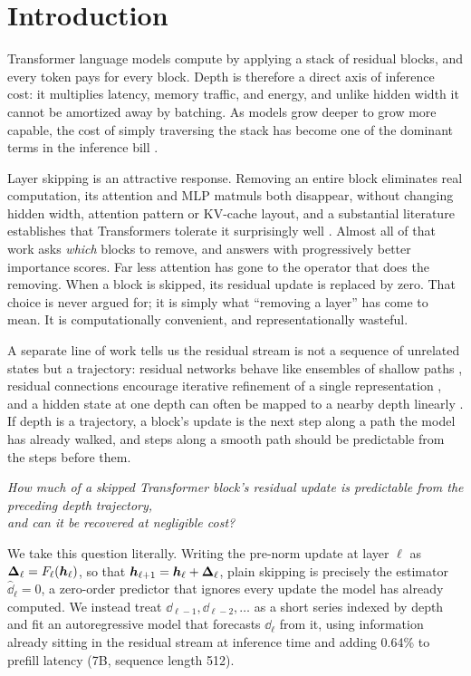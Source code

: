 \section{Introduction}
\label{sec:introduction}

Transformer language models compute by applying a stack of residual blocks, and
every token pays for every block. Depth is therefore a direct axis of inference
cost: it multiplies latency, memory traffic, and energy, and unlike hidden width
it cannot be amortized away by batching. As models grow deeper to grow more
capable, the cost of simply traversing the stack has become one of the dominant
terms in the inference bill \citep{zhen2025taming}.

Layer skipping is an attractive response. Removing an entire block eliminates real
computation, its attention and MLP matmuls both disappear, without changing hidden
width, attention pattern or KV-cache layout, and a substantial literature establishes that
Transformers tolerate it surprisingly well \citep{men2024shortgpt, gromov2024unreasonable,
fan2020reducing}. Almost all of that work asks \emph{which} blocks to remove, and answers
with progressively better importance scores. Far less attention has gone to the operator
that does the removing. When a block is skipped, its residual update is replaced by zero.
That choice is never argued for; it is simply what ``removing a layer'' has come to mean.
It is computationally convenient, and representationally wasteful.

A separate line of work tells us the residual stream is not a sequence of unrelated states but a
trajectory: residual networks behave like ensembles of shallow paths \citep{veit2016residual},
residual connections encourage iterative refinement of a single representation
\citep{jastrzebski2018residual}, and a hidden state at one depth can often be mapped to a nearby
depth linearly \citep{din2023jump, belrose2023eliciting}. If depth is a trajectory, a block's
update is the next step along a path the model has already walked, and steps along a smooth path
should be predictable from the steps before them.

\begin{center}
\emph{How much of a skipped Transformer block's residual update is predictable from the preceding depth trajectory, \\ and can it be recovered at negligible
cost?}
\end{center}

We take this question literally. Writing the pre-norm update at layer $\ell$ as
$\bm{\Delta}_\ell = F_\ell(\bm{h}_\ell)$, so that $\bm{h}_{\ell+1} = \bm{h}_\ell + \bm{\Delta}_\ell$, plain
skipping is precisely the estimator $\widehat{\dd}_\ell = 0$, a zero-order predictor that
ignores every update the model has already computed. We instead treat $\dd_{\ell-1},
\dd_{\ell-2}, \dots$ as a short series indexed by depth and fit an autoregressive model
that forecasts $\dd_\ell$ from it, using information already sitting in the residual
stream at inference time and adding 0.64\% to prefill latency (7B, sequence length
512).

